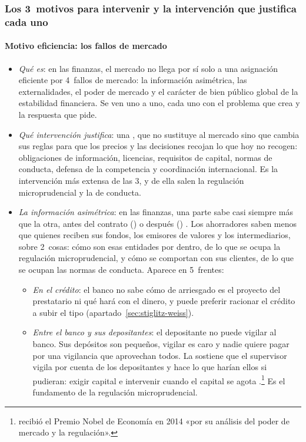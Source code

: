 \documentclass[11pt]{article}
\begin{document}
\subsubsection{Los 3~motivos para intervenir y la intervención que justifica cada uno}\label{sec:fallos}

\paragraph{Motivo eficiencia: los fallos de mercado}

\begin{itemize}
\item \emph{Qué es}: en las finanzas, el mercado no llega por sí solo a una asignación eficiente por 4~fallos de mercado: la información asimétrica, las externalidades, el poder de mercado y el carácter de bien público global de la estabilidad financiera. Se ven uno a uno, cada uno con el problema que crea y la respuesta que pide.
\item \emph{Qué intervención justifica}: una , que no sustituye al mercado sino que cambia sus reglas para que los precios y las decisiones recojan lo que hoy no recogen: obligaciones de información, licencias, requisitos de capital, normas de conducta, defensa de la competencia y coordinación internacional. Es la intervención más extensa de las 3, y de ella salen la regulación microprudencial y la de conducta.
\item \emph{La información asimétrica}: en las finanzas, una parte sabe casi siempre más que la otra, antes del contrato () o después () . Los ahorradores saben menos que quienes reciben sus fondos, los emisores de valores y los intermediarios, sobre 2~cosas: cómo son esas entidades por dentro, de lo que se ocupa la regulación microprudencial, y cómo se comportan con sus clientes, de lo que se ocupan las normas de conducta\nocite{Llewellyn1999}. Aparece en 5~frentes:
  \begin{itemize}
  \item \emph{En el crédito}: el banco no sabe cómo de arriesgado es el proyecto del prestatario ni qué hará con el dinero, y puede preferir racionar el crédito a subir el tipo (apartado~\ref{sec:stiglitz-weiss}).
  \item \emph{Entre el banco y sus depositantes}: el depositante no puede vigilar al banco. Sus depósitos son pequeños, vigilar es caro y nadie quiere pagar por una vigilancia que aprovechan todos. La  sostiene que el supervisor vigila por cuenta de los depositantes y hace lo que harían ellos si pudieran: exigir capital e intervenir cuando el capital se agota \nocite{DewatripontTirole1994}.\footnote{ recibió el Premio Nobel de Economía en 2014 «por su análisis del poder de mercado y la regulación»\nocite{Nobel2014Tirole}.} Es el fundamento de la regulación microprudencial.

\end{itemize}
\end{itemize}
\end{document}
